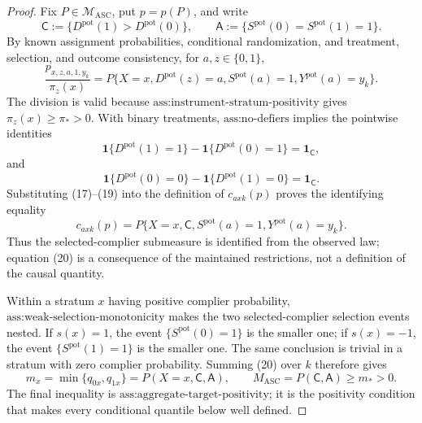 \documentclass{article}
\begin{document}
\begin{proof}
Fix \(P\in\mathcal M_{\mathrm{ASC}}\), put \(p=p(P)\), and write
\[
 \mathsf C
 :=\{D^{\mathrm{pot}}(1)>D^{\mathrm{pot}}(0)\},
 \qquad
 \mathsf A
 :=\{S^{\mathrm{pot}}(0)=S^{\mathrm{pot}}(1)=1\}.
\]
By known assignment probabilities, conditional randomization, and
treatment, selection, and outcome consistency, for
\(a,z\in\{0,1\}\),
\[
 \frac{p_{x,z,a,1,y_k}}{\pi_z(x)}
 =
 P\{X=x,D^{\mathrm{pot}}(z)=a,S^{\mathrm{pot}}(a)=1,
       Y^{\mathrm{pot}}(a)=y_k\}.
\tag{17}
\]
The division is valid because
\(\text{ass:instrument-stratum-positivity}\) gives
\(\pi_z(x)\geq\pi_*>0\).  With binary treatments,
\(\text{ass:no-defiers}\) implies the pointwise identities
\[
 \mathbf 1\{D^{\mathrm{pot}}(1)=1\}
 -\mathbf 1\{D^{\mathrm{pot}}(0)=1\}
 =\mathbf 1_{\mathsf C},
\tag{18}
\]
and
\[
 \mathbf 1\{D^{\mathrm{pot}}(0)=0\}
 -\mathbf 1\{D^{\mathrm{pot}}(1)=0\}
 =\mathbf 1_{\mathsf C}.
\tag{19}
\]
Substituting (17)--(19) into the definition of \(c_{axk}(p)\) proves
the identifying equality
\[
 c_{axk}(p)
 =P\{X=x,\mathsf C,S^{\mathrm{pot}}(a)=1,
       Y^{\mathrm{pot}}(a)=y_k\}.
\tag{20}
\]
Thus the selected-complier submeasure is identified from the observed
law; equation (20) is a consequence of the maintained restrictions,
not a definition of the causal quantity.

Within a stratum \(x\) having positive complier probability,
\(\text{ass:weak-selection-monotonicity}\) makes the two
selected-complier selection events nested.  If \(s(x)=1\), the event
\(\{S^{\mathrm{pot}}(0)=1\}\) is the smaller one; if \(s(x)=-1\), the
event \(\{S^{\mathrm{pot}}(1)=1\}\) is the smaller one.  The same
conclusion is trivial in a stratum with zero complier probability.
Summing (20) over \(k\) therefore gives
\[
 m_x=\min\{q_{0x},q_{1x}\}
 =P(X=x,\mathsf C,\mathsf A),
 \qquad
 M_{\mathrm{ASC}}=P(\mathsf C,\mathsf A)\geq m_*>0.
\tag{21}
\]
The final inequality is
\(\text{ass:aggregate-target-positivity}\); it is the positivity
condition that makes every conditional quantile below well defined.


\end{proof}
\end{document}
